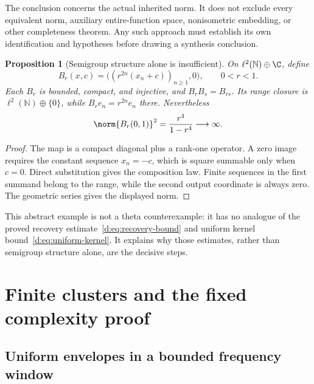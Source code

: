 \documentclass[11pt,a4paper]{article}
\numberwithin{equation}{section}
\newtheorem{proposition}[theorem]{Proposition}
\theoremstyle{definition}\newtheorem{definition}[theorem]{Definition}
\theoremstyle{remark}\newtheorem{remark}[theorem]{Remark}
\begin{document}
The conclusion concerns the actual inherited norm. It does not exclude every equivalent norm, auxiliary entire-function space, nonisometric embedding, or other completeness theorem. Any such approach must establish its own identification and hypotheses before drawing a synthesis conclusion.


\begin{proposition}[Semigroup structure alone is insufficient]\label{d:prop:semigroup-model}
On $\ell^2(\mathbb N)\oplus\C$, define
\[
 B_r(x,c)=\bigl((r^{2n}(x_n+c))_{n\ge1},0\bigr),\qquad 0<r<1.
\]
Each $B_r$ is bounded, compact, and injective, and $B_rB_s=B_{rs}$. Its range closure is $\ell^2(\mathbb N)\oplus\{0\}$, while $B_re_n=r^{2n}e_n$ there. Nevertheless
\[
 \norm{B_r(0,1)}^2=\frac{r^4}{1-r^4}\longrightarrow\infty.
\]
\end{proposition}
\begin{proof}
The map is a compact diagonal plus a rank-one operator. A zero image requires the constant sequence $x_n=-c$, which is square summable only when $c=0$. Direct substitution gives the composition law. Finite sequences in the first summand belong to the range, while the second output coordinate is always zero. The geometric series gives the displayed norm.
\end{proof}

This abstract example is not a theta counterexample: it has no analogue of the proved recovery estimate~\eqref{d:eq:recovery-bound} and uniform kernel bound~\eqref{d:eq:uniform-kernel}. It explains why those estimates, rather than semigroup structure alone, are the decisive steps.


\section{Finite clusters and the fixed complexity proof}\label{app:clusters}


\subsection{Uniform envelopes in a bounded frequency window}\label{e:sec:ode}
\end{document}

